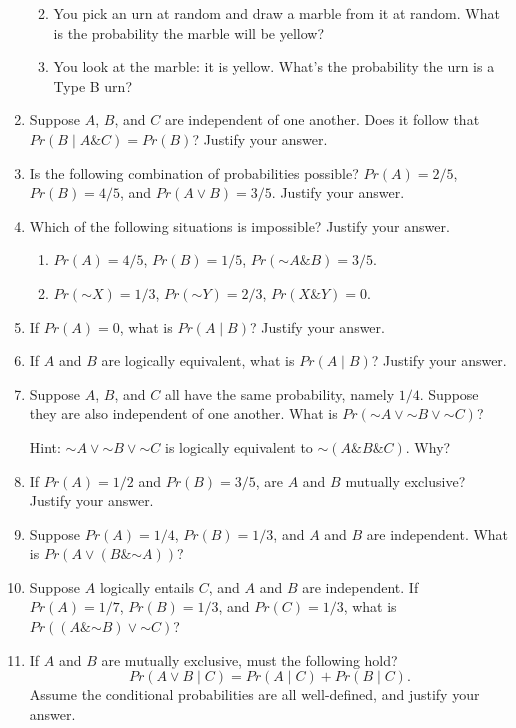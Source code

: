 \documentclass[justified]{tufte-book}
\providecommand{\tightlist}{%
  \setlength{\itemsep}{0pt}\setlength{\parskip}{0pt}}
\newcommand{\given}{\mid}
\renewcommand{\neg}{\mathbin{\sim}}
\renewcommand{\wedge}{\mathbin{\&}}
\newcommand{\p}{Pr}
\theoremstyle{definition}
\theoremstyle{definition}
\theoremstyle{definition}
\theoremstyle{remark}
\begin{document}
\begin{enumerate}
  \begin{enumerate}
  \def\labelenumii{\alph{enumii}.}
  \tightlist
  \item
    You pick an urn at random and draw a marble from it at random. What is the probability the marble will be yellow?
  \item
    You look at the marble: it is yellow. What's the probability the urn is a Type B urn?
  \end{enumerate}
\item
  Suppose \(A\), \(B\), and \(C\) are independent of one another. Does it follow that \(\p(B \given A \wedge C) = \p(B)\)? Justify your answer.
\item
  Is the following combination of probabilities possible? \(Pr(A) = 2/5\), \(Pr(B) = 4/5\), and \(Pr(A \vee B) = 3/5\). Justify your answer.
\item
  Which of the following situations is impossible? Justify your answer.

  \begin{enumerate}
  \def\labelenumii{\alph{enumii}.}
  \tightlist
  \item
    \(\p(A) = 4/5\), \(\p(B) = 1/5\), \(\p(\neg A \wedge B) = 3/5\).
  \item
    \(\p(\neg X) = 1/3\), \(\p(\neg Y) = 2/3\), \(\p(X \wedge Y) = 0\).
  \end{enumerate}
\item
  If \(Pr(A)=0\), what is \(\p(A \given B)\)? Justify your answer.
\item
  If \(A\) and \(B\) are logically equivalent, what is \(\p(A \given B)\)? Justify your answer.
\item
  Suppose \(A\), \(B\), and \(C\) all have the same probability, namely \(1/4\). Suppose they are also independent of one another. What is \(\p(\neg A \vee \neg B \vee \neg C)\)?

  Hint: \(\neg A \vee \neg B \vee \neg C\) is logically equivalent to \(\neg (A \wedge B \wedge C)\). Why?
\item
  If \(\p(A) = 1/2\) and \(\p(B) = 3/5\), are \(A\) and \(B\) mutually exclusive? Justify your answer.
\item
  Suppose \(\p(A) = 1/4\), \(\p(B) = 1/3\), and \(A\) and \(B\) are independent. What is \(\p(A \vee (B \wedge \neg A))\)?
\item
  Suppose \(A\) logically entails \(C\), and \(A\) and \(B\) are independent. If \(\p(A) = 1/7\), \(\p(B) = 1/3\), and \(\p(C)=1/3\), what is \(\p((A \wedge \neg B) \vee \neg C)\)?
\item
  If \(A\) and \(B\) are mutually exclusive, must the following hold?
  \[\p(A \vee B \given C) = \p(A \given C) + \p(B \given C).\]
  Assume the conditional probabilities are all well-defined, and justify your answer.


\end{enumerate}
\end{document}

